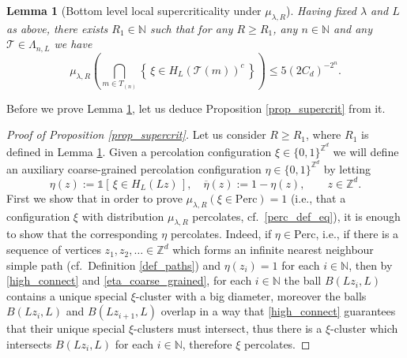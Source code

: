 \documentclass[a4paper,12pt]{article}
\newtheorem  {lemma}         [theorem]{Lemma}
\begin{document}
\begin{lemma}[Bottom level local supercriticality under $\mu_{\lambda,R}$]\label{lemma_supercrit_spread_out} Having fixed $\lambda$ and $L$ as above, there exists $R_1 \in \mathbb{N}$ such that for
any $R \geq R_1$, any $n \in \mathbb{N}$ and any $\mathcal{T} \in \Lambda_{n,L}$ we have
 \begin{equation}\label{supercrit_spread_out_eq}
   \mu_{\lambda,R}\left( \bigcap_{m  \in T_{(n)}} \left\{ \, \xi \in H_L(\mathcal{T}(m)  )^c \,  \right\}    \right)
   \leq 5 \left( 2 C_d  \right)^{-2^n}.
 \end{equation}
\end{lemma}
Before we prove Lemma \ref{lemma_supercrit_spread_out}, let us deduce Proposition \ref{prop_supercrit} from it.
\begin{proof}[Proof of Proposition \ref{prop_supercrit}]
Let us consider $R \geq R_1$, where $R_1$ is defined in Lemma \ref{lemma_supercrit_spread_out}.
 Given a percolation configuration $\xi \in \{0, 1 \}^{\mathbb{Z}^d}$ we will define an auxiliary
coarse-grained  percolation configuration $\eta \in \{0, 1 \}^{\mathbb{Z}^d}$  by letting
\begin{equation}\label{eta_coarse_grained}
 \eta(z):= \mathds{1}\left[ \, \xi \in H_L( L z  ) \, \right], \quad \overline{\eta}(z):=1-\eta(z),  \qquad  z \in \mathbb{Z}^d.
  \end{equation}
  First we show that in order to prove $\mu_{\lambda,R}( \xi \in \mathrm{Perc})=1$ (i.e., that a configuration $\xi$ with distribution $\mu_{\lambda,R}$ percolates, cf.\ \eqref{perc_def_eq}),
  it is enough to show that the corresponding $\eta$ percolates. Indeed, if $\eta \in \mathrm{Perc}$, i.e., if there is a sequence of vertices $z_1,z_2,\ldots \in \mathbb{Z}^d$ which forms an infinite nearest neighbour simple path (cf.\ Definition \ref{def_paths})
and $\eta(z_i)=1$ for each $i \in \mathbb{N}$, then by \eqref{high_connect} and \eqref{eta_coarse_grained}, for each $i \in \mathbb{N}$ the ball $B(L z_i,L)$ contains a unique special
$\xi$-cluster with a big diameter, moreover the balls $B(L z_i,L)$ and $B(L z_{i+1},L)$ overlap in a way that \eqref{high_connect} guarantees that their unique special $\xi$-clusters must intersect,
thus there is a $\xi$-cluster which intersects $B(L z_i,L)$ for each $i \in \mathbb{N}$, therefore $\xi$ percolates.

\smallskip


\end{proof}
\end{document}
